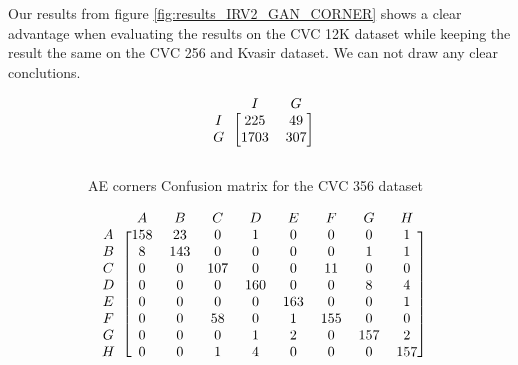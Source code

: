 Our results from figure \ref{fig:results_IRV2_GAN_CORNER} shows a clear advantage when evaluating the results on the CVC 12K dataset while keeping the result the same on the CVC 256 and Kvasir dataset. 
We can not draw any clear conclutions.



\begin{figure}[h]
\myfontsize
\caption*{\footnotesize \textmd{ \textbf{A}:{dyed-lifted-polyps} , \textbf{B}:{dyed-resection-margins} , \textbf{C}:{esophagitis} , \textbf{D}:{normal-cecum} , \textbf{E}:{normal-pylorus} , \textbf{F}:{normal-z-line} , \textbf{G}:{polyps} , \textbf{H}:{ulcerative-colitis} , \textbf{I}:{non-polyp}}}

\begin{subfigure}[b]{0.25\textwidth}
     
\[
\begin{blockarray}{ccc}
& I & G  \\
\begin{block}{c[cc]}
        I&225  &  49\\
        G& 1703 &  307\\
\end{block}
\end{blockarray}
 \]         

\caption{AE corners Confusion matrix for the CVC 356 dataset}
\label{mat:cvc356_CM_IRV2_AE_CORNER}
\end{subfigure}
\begin{subfigure}[b]{0.49\textwidth}  
\scriptsize     
\[
\begin{blockarray}{ccccccccc}
& A & B & C & D & E & F & G & H \\
\begin{block}{c[cccccccc]}
A&158 & 23 & 0 & 1 & 0 & 0 & 0 & 1\\
B&  8 & 143 & 0 & 0 & 0 & 0 & 1 & 1\\
C&  0 & 0 & 107 & 0 & 0 & 11 & 0 & 0\\
D&  0 & 0 & 0 & 160 & 0 & 0 & 8 & 4\\
E&  0 & 0 & 0 & 0 & 163 & 0 & 0 & 1\\
F&  0 & 0 & 58 & 0 & 1 & 155 & 0 & 0\\
G&  0 & 0 & 0 & 1 & 2 & 0 & 157 & 2\\
H&  0 & 0 & 1 & 4 & 0 & 0 & 0 & 157\\
\end{block}
\end{blockarray}
 \]        
        

\end{subfigure}
\end{figure}

